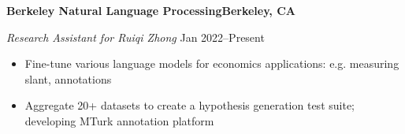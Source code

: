 \textbf{Berkeley Natural Language Processing\hfill Berkeley, CA}\par
\textit{Research Assistant for Ruiqi Zhong} \hfill Jan 2022--Present\par
\begin{itemize}
	\item Fine-tune various language models for economics applications: e.g. measuring slant,  annotations
	\item Aggregate 20+ datasets to create a hypothesis generation test suite; developing MTurk annotation platform
\end{itemize} \par